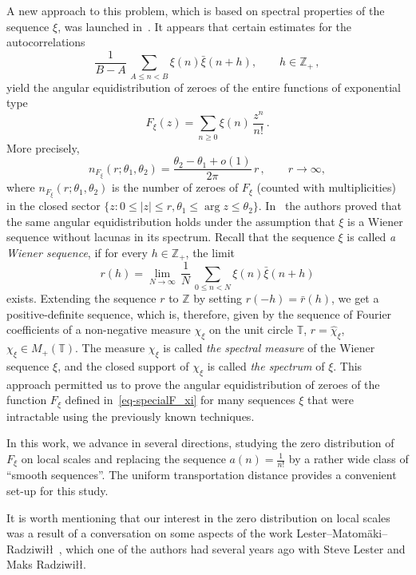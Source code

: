 \documentclass[11pt]{amsart}
\numberwithin{equation}{section}
\newcommand{\bZ}{\mathbb Z}
\newcommand{\bT}{\mathbb T}
\begin{document}
\medskip
A new approach to this problem, which is based on spectral properties of the sequence $\xi$,
was launched in~\cite{BBS, BNS}. It appears that certain estimates for the
autocorrelations
\[
\frac1{B-A}\, \sum_{A\le n< B} \xi (n) \bar{\xi}(n+h), \qquad h\in\bZ_+\,,
\]
yield the angular equidistribution of zeroes of the entire functions of exponential type
\begin{equation}\label{eq-specialF_xi}
F_\xi (z) = \sum_{n\ge 0} \xi(n)\, \frac{z^n}{n!}\,.
\end{equation}
More precisely,
\[
n_{F_\xi} (r; \theta_1, \theta_2) = \frac{\theta_2-\theta_1+o(1)}{2\pi}\, r\,, \qquad r\to\infty,
\]
where $n_{F_\xi} (r; \theta_1, \theta_2)$ is the number of zeroes of $F_\xi$ (counted with multiplicities) in the closed sector $\{z\colon 0\le |z|\le r, \theta_1 \le \arg z \le \theta_2 \}$.
In~\cite{BBS} the authors proved that the same angular equidistribution 
holds under the assumption that $\xi$ is
a Wiener sequence without lacunas in its spectrum. Recall that the sequence $\xi$ is called
{\em a Wiener sequence}, if for every $h\in\bZ_+$, the limit
\[
r(h) = \lim_{N\to\infty}\, \frac1N\, \sum_{0\le n < N} \xi(n) \bar{\xi}(n+h)
\]
exists.
Extending the sequence $r$ to $\bZ$ by setting $r(-h)=\bar{r}(h)$, we get a positive-definite sequence,
which is, therefore, given by the sequence of Fourier coefficients of a non-negative measure
$\chi_\xi$ on the unit circle $\bT$, $r=\widehat{\chi}_\xi$, $\chi_\xi\in M_+(\bT)$.
The measure $\chi_\xi$ is called {\em the spectral measure} of the Wiener sequence $\xi$, and the
closed support of $\chi_\xi$ is called {\em the spectrum} of $\xi$.
This approach permitted us to prove the angular equidistribution of zeroes of the function $F_\xi$
defined in~\eqref{eq-specialF_xi} for many  sequences $\xi$ that were intractable using
the previously known techniques.


\medskip
In this work, we advance in several directions, studying the zero distribution of $F_\xi$
on local scales and replacing the sequence $a(n)=\tfrac1{n!}$ by a rather wide class of ``smooth sequences''. The uniform transportation distance provides a convenient set-up for this study.

It is worth mentioning that our interest in
the zero distribution on local scales was a result of a conversation on some aspects of the work Lester--Matom\"aki--Radziwi{\l}{\l}~\cite{LMR}, which one of the authors had
several years ago with Steve Lester and Maks Radziwi{\l}{\l}.
\end{document}

